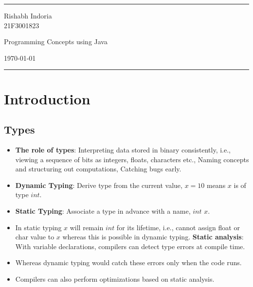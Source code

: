 \documentclass[a4paper]{article}
\begin{document}
\fancyhead[c]{}
\hrule \medskip
\begin{minipage}{0.295\textwidth}
\raggedright
Rishabh Indoria\\
21F3001823
\end{minipage}
\begin{minipage}{0.4\textwidth}
\centering
\LARGE
Programming Concepts using Java
\end{minipage}
\begin{minipage}{0.295\textwidth}
\raggedleft
\today \hfill \\
\end{minipage}
\medskip \hrule
\bigskip

\section{Introduction}
\subsection{Types}
\begin{itemize}
    \item \textbf{The role of types}: Interpreting data stored in binary consistently, i.e., viewing a sequence of bits as integers, floats, characters etc., Naming concepts and structuring out computations, Catching bugs early.
    \item \textbf{Dynamic Typing}: Derive type from the current value, $x=10$ means $x$ is of type $int$.
    \item \textbf{Static Typing}: Associate a type in advance with a name, $int$ $x$.
    \item In static typing $x$ will remain $int$ for its lifetime, i.e., cannot assign float or char value to $x$ whereas this is possible in dynamic typing.
    \textbf{Static analysis}: With variable declarations, compilers can detect type errors at compile time.
    \item Whereas dynamic typing would catch these errors only when the code runs.
    \item Compilers can also perform optimizations based on static analysis.
\end{itemize}
\end{document}
